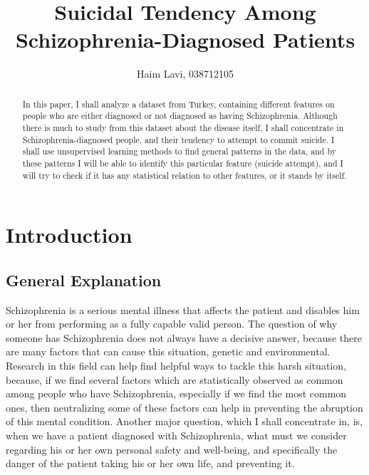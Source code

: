 \documentclass{article}
\title{Suicidal Tendency Among Schizophrenia-Diagnosed Patients}
\author{Haim Lavi, 038712105}
\begin{document}
\maketitle

\begin{abstract}
In this paper, I shall analyze a dataset from Turkey, containing different features on people who are either diagnosed or not diagnosed as having Schizophrenia. Although there is much to study from this dataset about the disease itself, I shall concentrate in Schizophrenia-diagnosed people, and their tendency to attempt to commit suicide. I shall use unsupervised learning methods to find general patterns in the data, and by these patterns I will be able to identify this particular feature (suicide attempt), and I will try to check if it has any statistical relation to other features, or it stands by itself.
\end{abstract}

\section{Introduction}
\subsection{General Explanation}
Schizophrenia is a serious mental illness that affects the patient and disables him or her from performing as a fully capable valid person. The question of why someone has Schizophrenia does not always have a decisive answer, because there are many factors that can cause this situation, genetic and environmental. Research in this field can help find helpful ways to tackle this harsh situation, because, if we find several factors which are statistically observed as common among people who have Schizophrenia, especially if we find the most common ones, then neutralizing some of these factors can help in preventing the abruption of this mental condition. Another major question, which I shall concentrate in, is, when we have a patient diagnosed with Schizophrenia, what must we consider regarding his or her own personal safety and well-being, and specifically the danger of the patient taking his or her own life, and preventing it.
\end{document}
